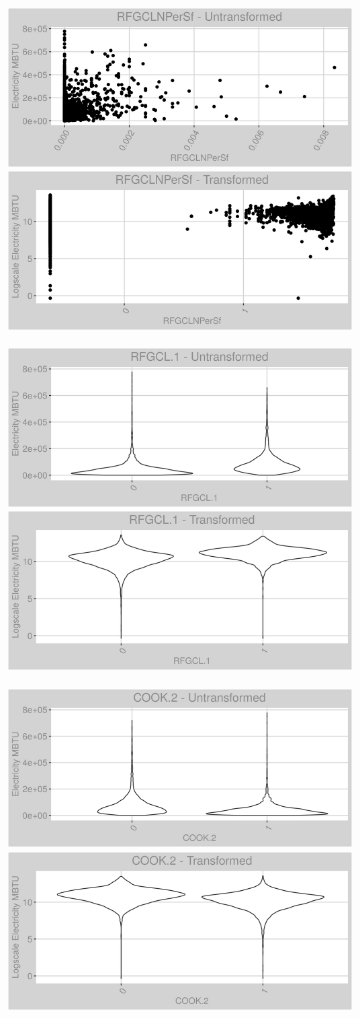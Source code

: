 \FloatBarrier
\newpage
\begin{figure}
\centering
\begin{subfigure}{1\textwidth}
\centering
\includegraphics[width=.49\textwidth, height=0.3\textheight]{Images/electricity_psf_var_original_9.png}
\includegraphics[width=.49\textwidth, height=0.3\textheight]{Images/electricity_psf_var_transformed_9.png}
\end{subfigure}
\begin{subfigure}{1\textwidth}
\centering
\includegraphics[width=.49\textwidth, height=0.3\textheight]{Images/electricity_psf_var_original_10.png}
\includegraphics[width=.49\textwidth, height=0.3\textheight]{Images/electricity_psf_var_transformed_10.png}
\end{subfigure}
\begin{subfigure}{1\textwidth}
\centering
\includegraphics[width=.49\textwidth, height=0.3\textheight]{Images/electricity_psf_var_original_11.png}
\includegraphics[width=.49\textwidth, height=0.3\textheight]{Images/electricity_psf_var_transformed_11.png}
\end{subfigure}
\end{figure}
